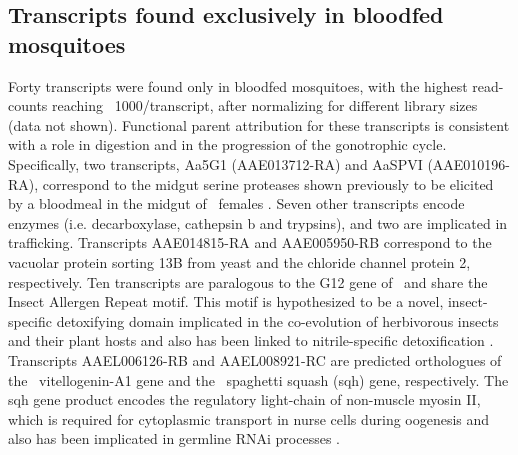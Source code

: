 \subsection{Transcripts found exclusively in bloodfed mosquitoes}
Forty transcripts were found only in bloodfed mosquitoes, with the highest read-counts reaching ~1000/transcript, after normalizing for different library sizes (data not shown). Functional parent attribution for these transcripts is consistent with a role in digestion and in the progression of the gonotrophic cycle. Specifically, two transcripts, Aa5G1 (AAE013712-RA) and AaSPVI (AAE010196-RA), correspond to the midgut serine proteases shown previously to be elicited by a bloodmeal in the midgut of \Aa\  females \cite{Brackney2010}. Seven other transcripts encode enzymes (i.e. decarboxylase, cathepsin b and trypsins), and two are implicated in trafficking. Transcripts AAE014815-RA and AAE005950-RB correspond to the vacuolar protein sorting 13B from yeast and the chloride channel protein 2, respectively. Ten transcripts are paralogous to the G12 gene of \Ag\ and share the Insect Allergen Repeat motif. This motif is hypothesized to be a novel, insect-specific detoxifying domain implicated in the co-evolution of herbivorous insects and their plant hosts and also has been linked to nitrile-specific detoxification \cite{Fischer2008}. Transcripts AAEL006126-RB and AAEL008921-RC are predicted orthologues of the \Cxq\ vitellogenin-A1 gene and the \Dmel\ spaghetti squash (sqh) gene, respectively. The sqh gene product encodes the regulatory light-chain of non-muscle myosin II, which is required for cytoplasmic transport in nurse cells during oogenesis and also has been implicated in germline \gls{RNAi} processes \cite{Pane2007}.

